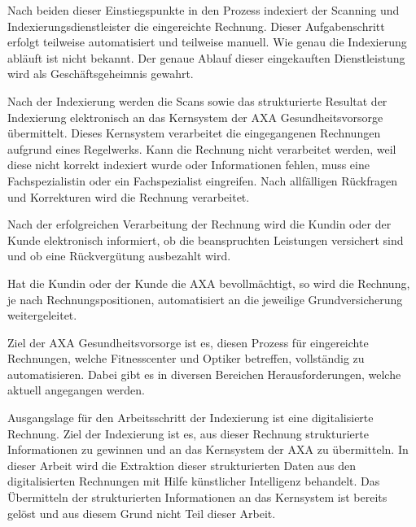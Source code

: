 Nach beiden dieser Einstiegspunkte in den Prozess indexiert der Scanning und Indexierungsdienstleister die eingereichte Rechnung. Dieser Aufgabenschritt erfolgt teilweise automatisiert und teilweise manuell. Wie genau die Indexierung abläuft ist nicht bekannt. Der genaue Ablauf dieser eingekauften Dienstleistung wird als Geschäftsgeheimnis gewahrt.

Nach der Indexierung werden die Scans sowie das strukturierte Resultat der Indexierung elektronisch an das Kernsystem der AXA Gesundheitsvorsorge übermittelt. Dieses Kern\-system verarbeitet die eingegangenen Rechnungen aufgrund eines Regelwerks. Kann die Rechnung nicht verarbeitet werden, weil diese nicht korrekt indexiert wurde oder Informationen fehlen, muss eine Fachspezialistin oder ein Fachspezialist eingreifen. Nach allfälligen Rückfragen und Korrekturen wird die Rechnung verarbeitet. 

Nach der erfolgreichen Verarbeitung der Rechnung wird die Kundin oder der Kunde elektronisch informiert, ob die beanspruchten Leistungen versichert sind und ob eine Rückvergütung ausbezahlt wird.

Hat die Kundin oder der Kunde die AXA bevollmächtigt, so wird die Rechnung, je nach Rechnungspositionen, automatisiert an die jeweilige Grundversicherung weitergeleitet.

Ziel der AXA Gesundheitsvorsorge ist es, diesen Prozess für eingereichte Rechnungen, welche Fitnesscenter und Optiker betreffen, vollständig zu automatisieren. Dabei gibt es in diversen Bereichen Herausforderungen, welche aktuell angegangen werden.

Ausgangslage für den Arbeitsschritt der Indexierung ist eine digitalisierte Rechnung. Ziel der Indexierung ist es, aus dieser Rechnung strukturierte Informationen zu gewinnen und an das Kernsystem der AXA zu übermitteln. In dieser Arbeit wird die Extraktion dieser strukturierten Daten aus den digitalisierten Rechnungen mit Hilfe künstlicher Intelligenz behandelt. Das Übermitteln der strukturierten Informationen an das Kernsystem ist bereits gelöst und aus diesem Grund nicht Teil dieser Arbeit.





